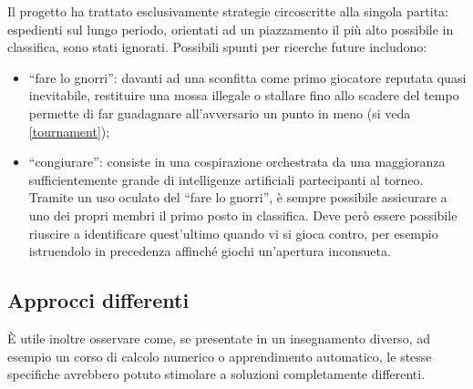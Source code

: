 \documentclass{article}
\begin{document}
Il progetto ha trattato esclusivamente strategie circoscritte alla singola
partita: espedienti sul lungo periodo, orientati ad un piazzamento il più alto
possibile in classifica, sono stati ignorati. Possibili spunti per ricerche
future includono:
\begin{itemize}
  \item ``fare lo gnorri'': davanti ad una sconfitta come primo giocatore
    reputata quasi inevitabile, restituire una mossa illegale o stallare fino
    allo scadere del tempo permette di far guadagnare all'avversario un punto in
    meno (si veda \ref{tournament});
  \item ``congiurare'': consiste in una cospirazione orchestrata da una
    maggioranza sufficientemente grande di intelligenze artificiali partecipanti
    al torneo. Tramite un uso oculato del ``fare lo gnorri'', è sempre possibile
    assicurare a uno dei propri membri il primo posto in classifica. Deve però
    essere possibile riuscire a identificare quest'ultimo quando vi si gioca
    contro, per esempio istruendolo in precedenza affinché giochi un'apertura
    inconsueta.
\end{itemize}

\subsection{Approcci differenti}

È utile inoltre osservare come, se presentate in un insegnamento diverso, ad
esempio un corso di calcolo numerico o apprendimento automatico, le stesse
specifiche avrebbero potuto stimolare a soluzioni completamente differenti.

\begin{sloppypar}
\printbibliography[
  heading=bibintoc
]
\end{sloppypar}
\end{document}
